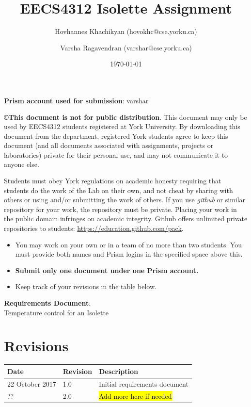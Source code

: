\documentclass[fontsize=12pt,paper=letter,twoside]{scrartcl}
\title{EECS4312 Isolette Assignment}
\author{{Hovhannes Khachikyan (hovokhc@cse.yorku.ca)}
\and {Varsha Ragavendran (varshar@cse.yorku.ca)}
}
\date{\today} %
\begin{document}
\maketitle
\noindent \textbf{Prism account used for submission}: {varshar}

\begin {mdframed}
\textbf{\copyright This document is not for public distribution}. This document may only be used by EECS4312 students registered at York University. By downloading this document from the department, registered York students agree to keep this document (and all documents associated with assignments, projects or laboratories) private for their personal use, and may not communicate it to anyone else. 

Students must obey York regulations on academic honesty requiring that students do the work of the Lab on their own, and not cheat by sharing with others or using and/or submitting the work of others. If you use \textit{github} or similar repository for your work,  the repository must be private. Placing your work in the public domain infringes on academic integrity. Github offers unlimited private repositories to students: \url{https://education.github.com/pack}.

\end {mdframed}


\begin{itemize}
  \item You may work on your own or in a team of no more than two students. You must provide both names and Prism logins in the specified space above this.
  \item \textbf{Submit only one document under one Prism account.}
  \item Keep track of your revisions in the table below.
\end{itemize}


\newpage

\vspace*{2in}
\begin{center}
\huge{\textbf{Requirements Document}:\\ Temperature control for an Isolette}
\end{center}

\bigskip\bigskip

\section*{Revisions}

\begin{tabular}{|l|l|p{3in}|}
\hline
Date & Revision& Description \\ 
\hline
22 October  2017
& 1.0       
& Initial requirements document\\ 
\hline
??
& 2.0      
& \hl{Add more here if needed}     \\
\hline
\end{tabular}
\end{document}
